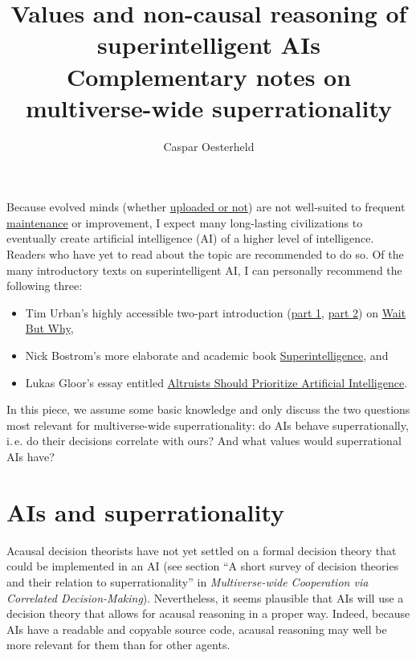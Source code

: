 \documentclass[]{article}
\title{Values and non-causal reasoning of superintelligent AIs \\ \vspace{5mm} \small{Complementary notes on multiverse-wide superrationality}}
\author{Caspar Oesterheld}
\date{}
\begin{document}
\maketitle

Because evolved minds (whether
\href{https://en.wikipedia.org/wiki/Mind_uploading}{uploaded or
not}) are not well-suited to frequent
\href{https://en.wikipedia.org/wiki/Software_maintenance}{maintenance}
or improvement, I expect many long-lasting civilizations to eventually
create artificial intelligence (AI) of a higher level of intelligence.
Readers who have yet to read about the topic are recommended to do so.
Of the many introductory texts on superintelligent AI, I can personally
recommend the following three:

\begin{itemize}
\item
  Tim Urban's highly accessible two-part introduction
  (\href{http://waitbutwhy.com/2015/01/artificial-intelligence-revolution-1.html}{part
  1},
  \href{http://waitbutwhy.com/2015/01/artificial-intelligence-revolution-2.html}{part
  2}) on \href{http://waitbutwhy.com/}{Wait But Why},
\item
  Nick Bostrom's more elaborate and academic book
  \href{https://en.wikipedia.org/wiki/Superintelligence:_Paths,_Dangers,_Strategies}{Superintelligence},
  and
\item
  Lukas Gloor's essay entitled
  \href{https://foundational-research.org/altruists-should-prioritize-artificial-intelligence/}{Altruists
  Should Prioritize Artificial Intelligence}.
\end{itemize}

In this piece, we assume some basic knowledge and only discuss the two
questions most relevant for multiverse-wide superrationality: do AIs
behave superrationally, i.\,e. do their decisions correlate with ours? And
what values would superrational AIs have?

\section{AIs and superrationality}\label{ais-and-superrationality}

Acausal decision theorists have not yet settled on a formal decision
theory that could be implemented in an AI (see section ``A short survey
of decision theories and their relation to superrationality'' in
\emph{Multiverse-wide Cooperation via Correlated Decision-Making}).
Nevertheless, it seems plausible that AIs will use a decision
theory that allows for acausal reasoning in a proper way. Indeed,
because AIs have a readable and copyable source code, acausal reasoning
may well be more relevant for them than for other agents.
\end{document}
